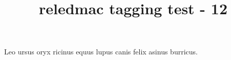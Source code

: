 \documentclass{article}
\title{reledmac tagging test - 12}
\begin{document}
\beginnumbering
\pstart
Leo  ursus  oryx  ricinus  equus 
lupus  canis  felix  asinus  burricus.

\pend
\endnumbering
\end{document}
